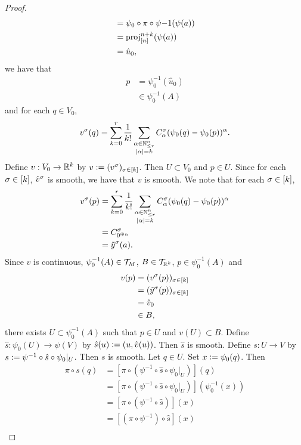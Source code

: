 \documentclass{book}
\begin{document}
\begin{proof}
\begin{align*}
		& = \psi_0 \circ \pi \circ \psi{-1}(\psi(a)) \\
		& = \operatorname{\text{proj}}^{n+k}_{[n]}(\psi(a)) \\
		& = \hat{u}_0,
	\end{align*}
	we have that 
	\begin{align*}
		p
		& = \psi_0^{-1}(\hat{u}_0) \\
		& \in \psi_0^{-1}(A) 
	\end{align*}
	and for each $q \in V_0$, 
	$$v^{\sigma}(q) = \sum_{k=0}^r \frac{1}{k!} \sum_{\substack{\alpha \in \mathbb{N}^n_{\leq r} \\ |\alpha| = k}} C^{\sigma}_{\alpha} (\psi_0(q) - \psi_0(p))^{\alpha}.$$
	Define $v: V_0 \rightarrow \mathbb{R}^k$ by $v \vcentcolon= (v^{\sigma})_{\sigma \in [k]}$. Then $U \subset V_0$ and $p \in U$.
	Since for each $\sigma \in [k]$, $\hat{v}^{\sigma}$ is smooth, we have that $v$ is smooth. We note that for each $\sigma \in [k]$,
	\begin{align*}
		v^{\sigma}(p)
		& = \sum_{k=0}^r \frac{1}{k!} \sum_{\substack{\alpha \in \mathbb{N}^n_{\leq r} \\ |\alpha| = k}} C^{\sigma}_{\alpha} (\psi_0(q) - \psi_0(p))^{\alpha} \\
		& = C^{\sigma}_{0^{\oplus n}} \\
		& = \tilde{y}^{\sigma} (a).
	\end{align*}
	Since $v$ is continuous, $\psi_0^{-1}(A) \in \mathcal{T}_M$, $B \in \mathcal{T}_{\mathbb{R}^k}$, $p \in \psi_0^{-1}(A)$ and 
	\begin{align*}
		v(p) 
		& = (v^{\sigma}(p))_{\sigma \in [k]} \\
		& = (\tilde{y}^{\sigma}(p))_{\sigma \in [k]} \\
		& = \hat{v}_0 \\
		& \in B,
	\end{align*}
	there exists $U \subset \psi_0^{-1}(A)$ such that $p \in U$ and $v(U) \subset B$. Define $\hat{s}:\psi_0(U) \rightarrow \psi(V)$ by $\hat{s}(u) \vcentcolon= (u, \hat{v}(u))$. Then $\hat{s}$ is smooth. Define $s:U \rightarrow V$ by $s \vcentcolon= \psi^{-1} \circ \hat{s} \circ \psi_0|_{U}$. Then $s$ is smooth. Let $q \in U$. Set $x \vcentcolon= \psi_0(q)$. Then 
	\begin{align*}
		\pi \circ s (q)
		& = [\pi \circ (\psi^{-1} \circ \hat{s} \circ \psi_0|_U)] (q) \\
		& = [\pi \circ (\psi^{-1} \circ \hat{s} \circ \psi_0|_U)] (\psi_0^{-1}(x)) \\
		& = [\pi \circ (\psi^{-1} \circ \hat{s})] (x) \\
		& = [(\pi \circ \psi^{-1}) \circ \hat{s}] (x) \\

\end{align*}
\end{proof}
\end{document}
